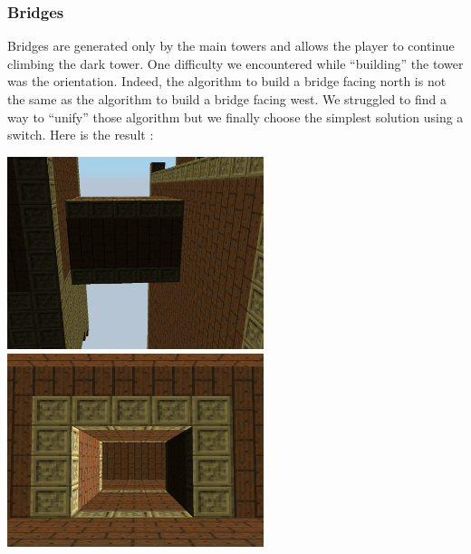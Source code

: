 \documentclass[article]{report}         %
\begin{document}
        \subsubsection{Bridges}
          Bridges are generated only by the main towers and allows the player to continue climbing the dark tower. One difficulty we encountered while ``building'' the tower was the orientation. Indeed, the algorithm to build a bridge facing north is not the same as the algorithm to build a bridge facing west. We struggled to find a way to ``unify'' those algorithm but we finally choose the simplest solution using a switch. Here is the result :
          \begin{center}
            \includegraphics[width=7.5cm]{images/DT/bridge1.png}
            \includegraphics[width=7.5cm]{images/DT/bridge2.png}
          \end{center}
\end{document}
